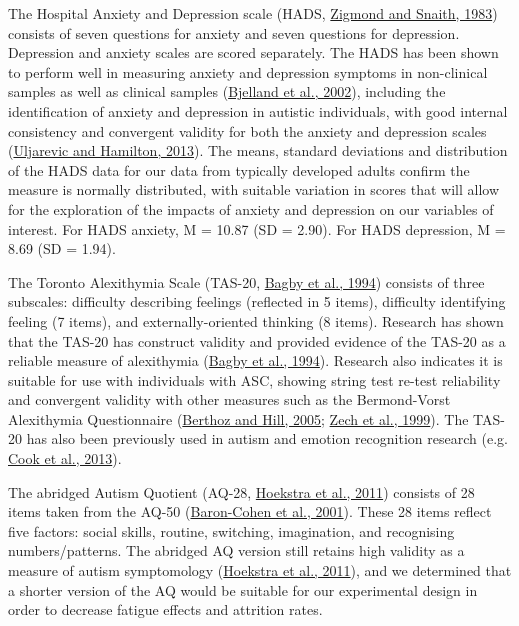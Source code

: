 \documentclass[
]{article}
\begin{document}
The Hospital Anxiety and Depression scale (HADS, \protect\hyperlink{ref-zigmond1983a}{Zigmond and Snaith, 1983}) consists of seven questions for anxiety and seven questions for depression. Depression and anxiety scales are scored separately. The HADS has been shown to perform well in measuring anxiety and depression symptoms in non-clinical samples as well as clinical samples (\protect\hyperlink{ref-bjelland2002a}{Bjelland et al., 2002}), including the identification of anxiety and depression in autistic individuals, with good internal consistency and convergent validity for both the anxiety and depression scales (\protect\hyperlink{ref-uljarevic2013a}{Uljarevic and Hamilton, 2013}). The means, standard deviations and distribution of the HADS data for our data from typically developed adults confirm the measure is normally distributed, with suitable variation in scores that will allow for the exploration of the impacts of anxiety and depression on our variables of interest. For HADS anxiety, M = 10.87 (SD = 2.90). For HADS depression, M = 8.69 (SD = 1.94).

The Toronto Alexithymia Scale (TAS-20, \protect\hyperlink{ref-bagby1994a}{Bagby et al., 1994}) consists of three subscales: difficulty describing feelings (reflected in 5 items), difficulty identifying feeling (7 items), and externally-oriented thinking (8 items). Research has shown that the TAS-20 has construct validity and provided evidence of the TAS-20 as a reliable measure of alexithymia (\protect\hyperlink{ref-bagby1994a}{Bagby et al., 1994}). Research also indicates it is suitable for use with individuals with ASC, showing string test re-test reliability and convergent validity with other measures such as the Bermond-Vorst Alexithymia Questionnaire (\protect\hyperlink{ref-berthoz2005a}{Berthoz and Hill, 2005}; \protect\hyperlink{ref-zech1999a}{Zech et al., 1999}). The TAS-20 has also been previously used in autism and emotion recognition research (e.g. \protect\hyperlink{ref-cook2013a}{Cook et al., 2013}).

The abridged Autism Quotient (AQ-28, \protect\hyperlink{ref-hoekstra2011a}{Hoekstra et al., 2011}) consists of 28 items taken from the AQ-50 (\protect\hyperlink{ref-baron-cohen2001a}{Baron-Cohen et al., 2001}). These 28 items reflect five factors: social skills, routine, switching, imagination, and recognising numbers/patterns. The abridged AQ version still retains high validity as a measure of autism symptomology (\protect\hyperlink{ref-hoekstra2011a}{Hoekstra et al., 2011}), and we determined that a shorter version of the AQ would be suitable for our experimental design in order to decrease fatigue effects and attrition rates.
\end{document}
